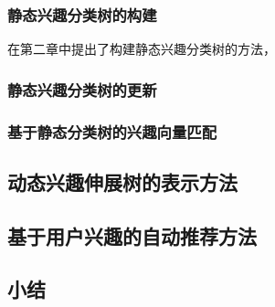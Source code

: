 \subsubsection{静态兴趣分类树的构建}
在第二章中提出了构建静态兴趣分类树的方法，

\subsubsection{静态兴趣分类树的更新}

\subsubsection{基于静态分类树的兴趣向量匹配}

\subsection{动态兴趣伸展树的表示方法}

\subsection{基于用户兴趣的自动推荐方法}

\subsection{小结}
